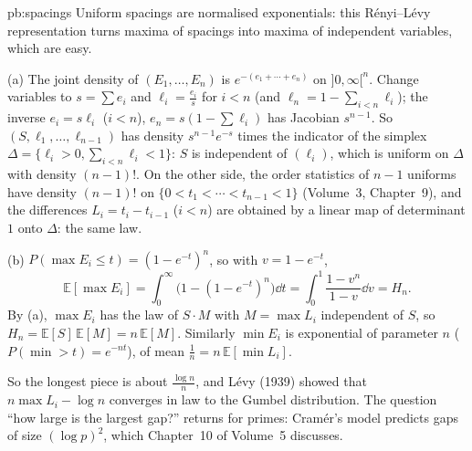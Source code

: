 \begin{solution}{pb:spacings}
\idea Uniform spacings are normalised exponentials: this Rényi--Lévy representation turns maxima of spacings into maxima of independent
variables, which are easy.

\writeup (a) The joint density of $(E_1,\dots,E_n)$ is $e^{-(e_1+\cdots+e_n)}$ on $]0,\infty[^n$. Change variables to $s=\sum e_i$ and $\ell_i=\frac{e_i}s$ for $i<n$
(and $\ell_n=1-\sum_{i<n}\ell_i$); the inverse $e_i=s\ell_i$ ($i<n$), $e_n=s(1-\sum\ell_i)$ has Jacobian $s^{n-1}$. So $(S,\ell_1,\dots,\ell_{n-1})$ has density
$s^{n-1}e^{-s}$ times the indicator of the simplex $\Delta=\{\ell_i>0,\sum_{i<n}\ell_i<1\}$: $S$ is independent of $(\ell_i)$, which is uniform on $\Delta$ with
density $(n-1)!$. On the other side, the order statistics of $n-1$ uniforms have density $(n-1)!$ on $\{0<t_1<\cdots<t_{n-1}<1\}$ (Volume~3, Chapter~9), and
the differences $L_i=t_i-t_{i-1}$ ($i<n$) are obtained by a linear map of determinant $1$ onto $\Delta$: the same law.

(b) $P(\max E_i\le t)=(1-e^{-t})^n$, so with $v=1-e^{-t}$,
\[
\mathbb E[\max E_i]=\int_0^\infty\bigl(1-(1-e^{-t})^n\bigr)\dd t=\int_0^1\frac{1-v^n}{1-v}\dd v=H_n.
\]
By (a), $\max E_i$ has the law of $S\cdot M$ with $M=\max L_i$ independent of $S$, so $H_n=\mathbb E[S]\,\mathbb E[M]=n\,\mathbb E[M]$. Similarly $\min E_i$ is
exponential of parameter $n$ ($P(\min>t)=e^{-nt}$), of mean $\frac1n=n\,\mathbb E[\min L_i]$.

\leads So the longest piece is about $\frac{\log n}n$, and Lévy (1939) showed that $n\max L_i-\log n$ converges in law to the Gumbel distribution.
The question ``how large is the largest gap?'' returns for primes: Cramér's model predicts gaps of size $(\log p)^2$, which Chapter~10 of
Volume~5 discusses.
\end{solution}

